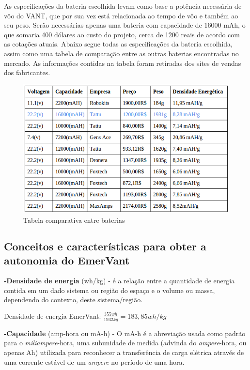 As especificações da bateria escolhida levam como base a potência necessária de vôo do VANT, que por sua vez está relacionada ao tempo de vôo e também ao seu peso.  Serão necessárias apenas uma bateria com capacidade de 16000 mAh, o que somaria 400 dólares ao custo do projeto, cerca de 1200 reais de acordo com as cotações atuais. Abaixo segue todas as especificações da bateria escolhida, assim como uma tabela de comparação entre as outras baterias encontradas no mercado. 
As informações contidas na tabela foram retiradas dos sites de vendas dos fabricantes.
 \begin{figure}[h!]
    \centering
	\includegraphics[keepaspectratio=true,scale=0.7]{figuras/comparacaobaterias.png}
    \caption{Tabela comparativa entre baterias}
\end{figure}

\nocite{bateria1}
\nocite{bateria2}
\nocite{bateria3}
\nocite{bateria4}
\nocite{bateria5}
\nocite{bateria6}
\nocite{bateria7}
\nocite{bateria8}
\nocite{bateria9}
\nocite{bateria10}

\subsection{Conceitos e características para obter a autonomia do EmerVant}

\textbf{-Densidade de energia} (wh/kg) - é a relação entre a quantidade de energia contida em um dado sistema ou região do espaço e o volume ou massa, dependendo do contexto, deste sistema/região.

	Densidade de energia EmerVant: $\frac{355wh}{1932kg} =  183,85 wh/kg$

\textbf{-Capacidade} (amp-hora ou mA-h) -  O mA-h é a abreviação usada como padrão para o \textit{miliampere}-hora, uma subunidade de medida (advinda do \textit{ampere}-hora, ou apenas Ah) utilizada para reconhecer a transferência de carga elétrica através de uma corrente estável de um \textit{ampere} no período de uma hora.

